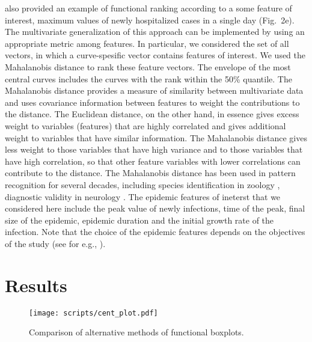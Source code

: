 \documentclass[12pt]{article}
\theoremstyle{definition} %
\begin{document}
\cite{juul2021fixed} also provided an example of functional ranking according to a some feature of interest, maximum values of newly hospitalized cases in a single day (Fig.~2e). The multivariate generalization of this approach can be implemented by using an appropriate metric among features. In particular, we considered the set of all vectors, in which a curve-spesific vector contains features of interest. We used the Mahalanobis distance \citep{mahalanobis1936generalized} to rank these feature vectors. The envelope of the most central curves includes the curves with the rank within the 50\% quantile. The Mahalanobis distance provides a measure of similarity between multivariate data and uses covariance information between features to weight the contributions to the distance. The Euclidean distance, on the other hand, in essence gives excess weight to variables (features) that are highly correlated and gives additional weight to variables that have similar information. The Mahalanobis distance gives less weight to those variables that have high variance and to those variables that have high correlation, so that other feature variables with lower correlations can contribute to the distance. The Mahalanobis distance has been used in pattern recognition for several decades,
including species identification in zoology \citep{robinson1975geographical}, diagnostic validity in neurology \citep{john1988neurometrics}. 
The epidemic features of ineterst that we considered here include the peak value of newly infections, time of the peak, final size of the epidemic, epidemic duration and the initial growth rate of the infection. Note that the choice of the epidemic features depends on the objectives of the study (see for e.g., \cite{probert2016decision}).



\section{Results}

\begin{figure}[h!]
\centering
\texttt{[image: scripts/cent\_plot.pdf]}
\caption{Comparison of alternative methods of functional boxplots.}\label{p.a}
\end{figure}



\end{document}
